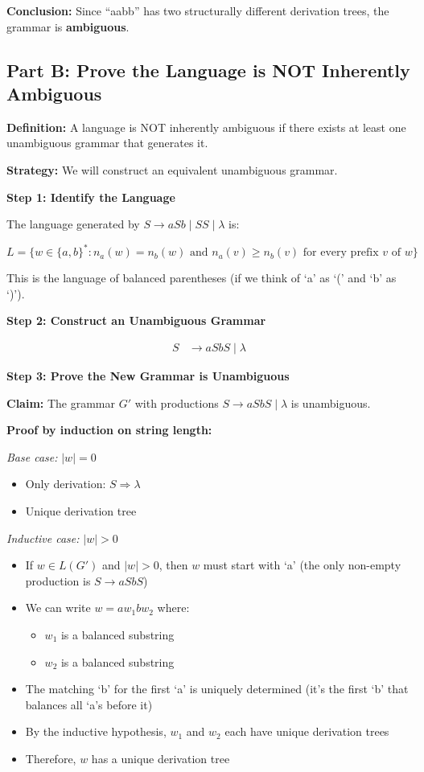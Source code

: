 \documentclass[12pt]{article}
\begin{document}
\textbf{Conclusion:} Since ``aabb'' has two structurally different derivation trees, the grammar is \textbf{ambiguous}. \checkmark

\subsection{Part B: Prove the Language is NOT Inherently Ambiguous}

\textbf{Definition:} A language is NOT inherently ambiguous if there exists at least one unambiguous grammar that generates it.

\textbf{Strategy:} We will construct an equivalent unambiguous grammar.

\textbf{Step 1: Identify the Language}

The language generated by $S \to aSb \mid SS \mid \lambda$ is:

$$L = \{w \in \{a,b\}^* : n_a(w) = n_b(w) \text{ and } n_a(v) \geq n_b(v) \text{ for every prefix } v \text{ of } w\}$$

This is the language of balanced parentheses (if we think of `a' as `(' and `b' as `)').

\textbf{Step 2: Construct an Unambiguous Grammar}

\begin{align*}
S &\to aSbS \mid \lambda
\end{align*}

\textbf{Step 3: Prove the New Grammar is Unambiguous}

\textbf{Claim:} The grammar $G'$ with productions $S \to aSbS \mid \lambda$ is unambiguous.

\textbf{Proof by induction on string length:}

\textit{Base case:} $|w| = 0$
\begin{itemize}
\item Only derivation: $S \Rightarrow \lambda$
\item Unique derivation tree \checkmark
\end{itemize}

\textit{Inductive case:} $|w| > 0$
\begin{itemize}
\item If $w \in L(G')$ and $|w| > 0$, then $w$ must start with `a' (the only non-empty production is $S \to aSbS$)
\item We can write $w = a w_1 b w_2$ where:
  \begin{itemize}
  \item $w_1$ is a balanced substring
  \item $w_2$ is a balanced substring
  \end{itemize}
\item The matching `b' for the first `a' is uniquely determined (it's the first `b' that balances all `a's before it)
\item By the inductive hypothesis, $w_1$ and $w_2$ each have unique derivation trees
\item Therefore, $w$ has a unique derivation tree \checkmark
\end{itemize}
\end{document}
